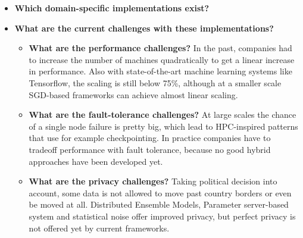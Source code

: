 \begin{itemize}
	\begin{itemize}
		\item \textbf{Which domain-specific implementations exist?}
		\item \textbf{What are the current challenges with these implementations?}
		\begin{itemize}
			\item \textbf{What are the performance challenges?} In the past, companies had to increase the number of machines quadratically to get a linear increase in performance. Also with state-of-the-art machine learning systems like Tensorflow, the scaling is still below 75\%, although at a smaller scale SGD-based frameworks can achieve almost linear scaling.
			\item \textbf{What are the fault-tolerance challenges?} At large scales the chance of a single node failure is pretty big, which lead to HPC-inspired patterns that use for example checkpointing. In practice companies have to tradeoff performance with fault tolerance, because no good hybrid approaches have been developed yet.
			\item \textbf{What are the privacy challenges?} Taking political decision into account, some data is not allowed to move past country borders or even be moved at all. Distributed Ensemble Models, Parameter server-based system and statistical noise offer improved privacy, but perfect privacy is not offered yet by current frameworks.
		\end{itemize}
	\end{itemize}
\end{itemize}